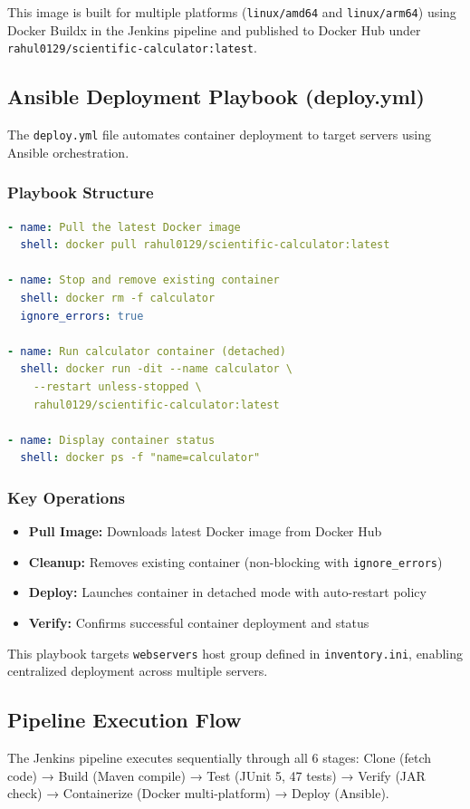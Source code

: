 \documentclass[12pt,a4paper]{article}
\begin{document}
This image is built for multiple platforms (\texttt{linux/amd64} and \texttt{linux/arm64}) using Docker Buildx in the Jenkins pipeline and published to Docker Hub under \texttt{rahul0129/scientific-calculator:latest}.

\subsection{Ansible Deployment Playbook (deploy.yml)}
The \texttt{deploy.yml} file automates container deployment to target servers using Ansible orchestration.

\subsubsection{Playbook Structure}
\begin{lstlisting}[language=yaml,caption=deploy.yml Tasks]
- name: Pull the latest Docker image
  shell: docker pull rahul0129/scientific-calculator:latest

- name: Stop and remove existing container
  shell: docker rm -f calculator
  ignore_errors: true

- name: Run calculator container (detached)
  shell: docker run -dit --name calculator \
    --restart unless-stopped \
    rahul0129/scientific-calculator:latest

- name: Display container status
  shell: docker ps -f "name=calculator"
\end{lstlisting}

\subsubsection{Key Operations}
\begin{itemize}
    \item \textbf{Pull Image:} Downloads latest Docker image from Docker Hub
    \item \textbf{Cleanup:} Removes existing container (non-blocking with \texttt{ignore\_errors})
    \item \textbf{Deploy:} Launches container in detached mode with auto-restart policy
    \item \textbf{Verify:} Confirms successful container deployment and status
\end{itemize}

This playbook targets \texttt{webservers} host group defined in \texttt{inventory.ini}, enabling centralized deployment across multiple servers.

\subsection{Pipeline Execution Flow}
The Jenkins pipeline executes sequentially through all 6 stages: Clone (fetch code) → Build (Maven compile) → Test (JUnit 5, 47 tests) → Verify (JAR check) → Containerize (Docker multi-platform) → Deploy (Ansible).
\end{document}
